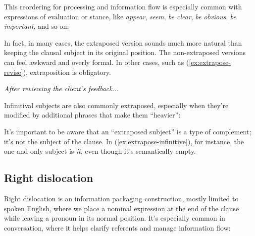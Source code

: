 This reordering for processing and information flow is especially common with expressions of evaluation or stance, like \textit{appear}, \textit{seem}, \textit{be clear}, \textit{be obvious}, \textit{be important}, and so on:

\ea\label{ex:extrapose-seem}
    \z
\ex\label{ex:extrapose-clear}
    \z
\z

In fact, in many cases, the extraposed version sounds much more natural than keeping the clausal subject in its original position. The non-extraposed versions can feel awkward and overly formal. In other cases, such as (\ref{ex:extrapose-revise}), extraposition is obligatory.

\ea\label{ex:extrapose-revise}
    \textit{After reviewing the client's feedback...}
    \z
\z

Infinitival subjects are also commonly extraposed, especially when they're modified by additional phrases that make them ``heavier'':

\ea\label{ex:extrapose-infinitive}
    \z
\z

It's important to be aware that an ``extraposed subject'' is a type of complement; it's not the subject of the clause. In (\ref{ex:extrapose-infinitive}), for instance, the one and only subject is \textit{it}, even though it's semantically empty.

\subsection{Right dislocation} \label{sec:right-dislocation}

Right dislocation is an information packaging construction, mostly limited to spoken English, where we place a nominal expression at the end of the clause while leaving a pronoun in its normal position. It's especially common in conversation, where it helps clarify referents and manage information flow:

